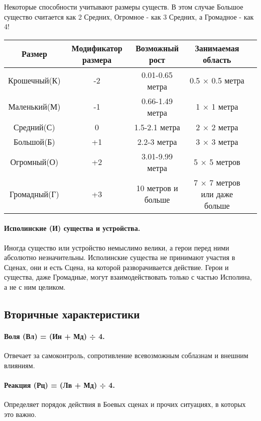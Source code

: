Некоторые способности учитывают размеры существ. В этом случае Большое существо считается как 2 Средних, Огромное - как 3 Средних, а Громадное - как 4!
\begin{center}
    \begin{tabular}{ |c|c|c|c|c| }
        \hline
        Размер & Модификатор размера & Возможный рост & Занимаемая область
        \\ \hline
        Крошечный(К) & -2 & 0.01-0.65 метра & 0.5 × 0.5 метра
        \\ \hline
        Маленький(М) & -1 & 0.66-1.49 метра & 1 × 1 метра
        \\ \hline
        Средний(С) & 0 & 1.5-2.1 метра & 2 × 2 метра
        \\ \hline
        Большой(Б) & +1 & 2.2-3 метра & 3 × 3 метра
        \\ \hline
        Огромный(О) & +2 & 3.01-9.99 метра & 5 × 5 метров
        \\ \hline
        Громадный(Г) & +3 & 10 метров и больше & 7 × 7 метров или даже больше
        \\ \hline
    \end{tabular}
\end{center}
\paragraph{Исполинские (И) существа и устройства.} Иногда существо или устройство немыслимо велики, а герои перед ними абсолютно незначительны. Исполинские существа не принимают участия в Сценах, они и есть Сцена, на которой разворачивается действие. Герои и существа, даже Громадные, могут взаимодействовать только с частью Исполина, а не с ним целиком.

\subsection{Вторичные характеристики}
\paragraph{Воля (Вл) = (Ин + Мд) ÷ 4.} Отвечает за самоконтроль, сопротивление всевозможным соблазнам и внешним влияниям.

\paragraph{Реакция (Рц) = (Лв + Мд) ÷ 4.} Определяет порядок действия в Боевых сценах и прочих ситуациях, в которых это важно.


